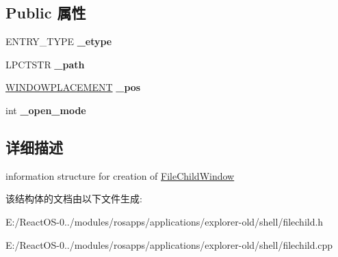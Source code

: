 \subsection*{Public 属性}
\begin{DoxyCompactItemize}
\item 
\mbox{\label{struct_file_child_wnd_info_a8d2203dffc381d1e17f227d7e36653fd}} 
E\+N\+T\+R\+Y\+\_\+\+T\+Y\+PE {\bfseries \+\_\+etype}
\item 
\mbox{\label{struct_file_child_wnd_info_a7d3a5fd18cf4284b9243a3558cd210ed}} 
L\+P\+C\+T\+S\+TR {\bfseries \+\_\+path}
\item 
\mbox{\label{struct_file_child_wnd_info_a3f14bfb1e044ce1cd242106e431fed59}} 
\hyperlink{struct___w_i_n_d_o_w_p_l_a_c_e_m_e_n_t}{W\+I\+N\+D\+O\+W\+P\+L\+A\+C\+E\+M\+E\+NT} {\bfseries \+\_\+pos}
\item 
\mbox{\label{struct_file_child_wnd_info_a1976a480a88c66c45cdfbaa559047bcc}} 
int {\bfseries \+\_\+open\+\_\+mode}
\end{DoxyCompactItemize}


\subsection{详细描述}
information structure for creation of \hyperlink{struct_file_child_window}{File\+Child\+Window} 

该结构体的文档由以下文件生成\+:\begin{DoxyCompactItemize}
\item 
E\+:/\+React\+O\+S-\/0../modules/rosapps/applications/explorer-\/old/shell/filechild.\+h\item 
E\+:/\+React\+O\+S-\/0../modules/rosapps/applications/explorer-\/old/shell/filechild.\+cpp\end{DoxyCompactItemize}
